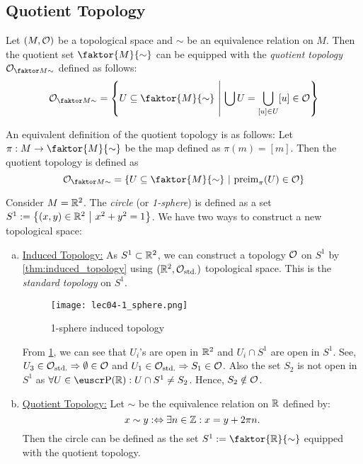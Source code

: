 \subsection{Quotient Topology}
\begin{definition}\label{def:quotient_topology}
	Let \((M, \mathcal{O})\) be a topological space and \(\sim\) be an equivalence relation on \(M\). Then the quotient set \(\faktor{M}{\sim}\) can be equipped with the \emph{quotient topology} \(\Oq{M}\) defined as follows:
	\begin{equation}
		\Oq{M} = \qty{U \subseteq \faktor{M}{\sim} \mid \bigcup U = \bigcup_{[u] \in U} [u] \in \O} \label{eq:quotient_topology}
	\end{equation}
\end{definition}
An equivalent definition of the quotient topology is as follows: Let \(\pi: M \to \faktor{M}{\sim}\) be the map defined as \(\pi(m) = [m]\). Then the quotient topology is defined as
\begin{equation}
	\Oq{M} = \qty{U \subseteq \faktor{M}{\sim} \mid \preimg_{\pi}(U) \in \O} \label{eq:quotient_topology_map}
\end{equation}

\begin{example}
	Consider \(M = \mathbb R^2\). The \emph{circle} (or \emph{1-sphere}) is defined as a set \(S^1 := \qty{(x, y) \in \mathbb R^2 \ \middle|\ x^2 + y^2 = 1}\). We have two ways to construct a new topological space:
	\begin{enumerate}[(a)]
		\item \uline{Induced Topology:} As \(S^1 \subset \mathbb R^2\), we can construct a topology \(\mathcal{O}\) on \(S^1\) by \cref{thm:induced_topology} using \((\mathbb R^2, \mathcal{O}_{\text{std.}})\) topological space. This is the \emph{standard topology} on \(S^1\).
		      \begin{figure}[H]
			      \centering
			      \texttt{[image: lec04-1\_sphere.png]}
			      \caption{1-sphere induced topology}
			      \label{fig:1-sphere_induced_topology}
		      \end{figure} \noindent
		      From \cref{fig:1-sphere_induced_topology}, we can see that \(U_i\)'s are open in \(\mathbb R^2\) and \(U_i \cap S^1\) are open in \(S^1\). See, \(U_3 \in \mathcal{O}_{\text{std.}} \Rightarrow \emptyset \in \mathcal{O}\) and \(U_1 \in \mathcal{O}_{\text{std.}} \Rightarrow S_1 \in \mathcal{O}\). Also the set \(S_2\) is not open in \(S^1\) as \(\forall U \in \powerset(\R): U \cap S^1 \neq S_2\). Hence, \(S_2 \notin \mathcal{O}\).

		\item \uline{Quotient Topology:} Let $\sim$ be the equivalence relation on $\mathbb R$ defined by:
		      \begin{equation*}
			      x \sim y :\Leftrightarrow \exists n \in \mathbb Z : x = y + 2 \pi n.
		      \end{equation*}
		      Then the circle can be defined as the set $S^1 := \faktor{\R}{\sim}$ equipped with the quotient topology.
	\end{enumerate}
\end{example}

